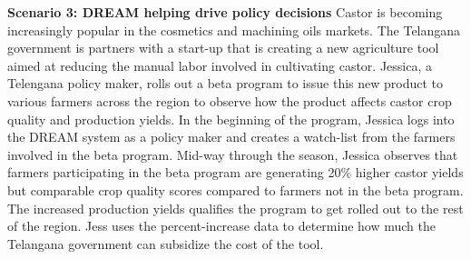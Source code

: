 \begin{flushleft}
\textbf{Scenario 3: DREAM helping drive policy decisions} 
Castor is becoming increasingly popular in the cosmetics and machining oils markets. The Telangana government is partners with a start-up that is creating a new agriculture tool aimed at reducing the manual labor involved in cultivating castor. Jessica, a Telengana policy maker, rolls out a beta program to issue this new product to various farmers across the region to observe how the product affects castor crop quality and production yields. In the beginning of the program, Jessica logs into the DREAM system as a policy maker and creates a watch-list from the farmers involved in the beta program. Mid-way through the season, Jessica observes that farmers participating in the beta program are generating 20\% higher castor yields but comparable crop quality scores compared to farmers not in the beta program. The increased production yields qualifies the program to get rolled out to the rest of the region. Jess uses the percent-increase data to determine how much the Telangana government can subsidize the cost of the tool. 
\end{flushleft}
